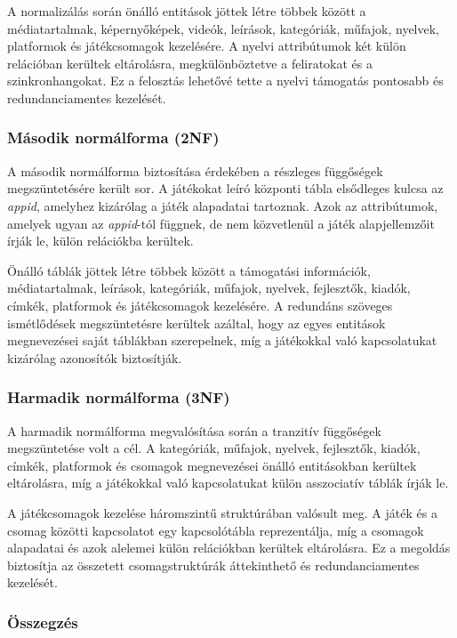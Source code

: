 A normalizálás során önálló entitások jöttek létre többek között a médiatartalmak, képernyőképek, videók, leírások, kategóriák, műfajok, nyelvek, platformok és játékcsomagok kezelésére. A nyelvi attribútumok két külön relációban kerültek eltárolásra, megkülönböztetve a feliratokat és a szinkronhangokat. Ez a felosztás lehetővé tette a nyelvi támogatás pontosabb és redundanciamentes kezelését.

\subsubsection{Második normálforma (2NF)}

A második normálforma biztosítása érdekében a részleges függőségek megszüntetésére került sor. A játékokat leíró központi tábla elsődleges kulcsa az \textit{appid}, amelyhez kizárólag a játék alapadatai tartoznak. Azok az attribútumok, amelyek ugyan az \textit{appid}-tól függnek, de nem közvetlenül a játék alapjellemzőit írják le, külön relációkba kerültek.

Önálló táblák jöttek létre többek között a támogatási információk, médiatartalmak, leírások, kategóriák, műfajok, nyelvek, fejlesztők, kiadók, címkék, platformok és játékcsomagok kezelésére. A redundáns szöveges ismétlődések megszüntetésre kerültek azáltal, hogy az egyes entitások megnevezései saját táblákban szerepelnek, míg a játékokkal való kapcsolatukat kizárólag azonosítók biztosítják.

\subsubsection{Harmadik normálforma (3NF)}

A harmadik normálforma megvalósítása során a tranzitív függőségek megszüntetése volt a cél. A kategóriák, műfajok, nyelvek, fejlesztők, kiadók, címkék, platformok és csomagok megnevezései önálló entitásokban kerültek eltárolásra, míg a játékokkal való kapcsolatukat külön asszociatív táblák írják le.

A játékcsomagok kezelése háromszintű struktúrában valósult meg. A játék és a csomag közötti kapcsolatot egy kapcsolótábla reprezentálja, míg a csomagok alapadatai és azok alelemei külön relációkban kerültek eltárolásra. Ez a megoldás biztosítja az összetett csomagstruktúrák áttekinthető és redundanciamentes kezelését.

\subsubsection{Összegzés}

